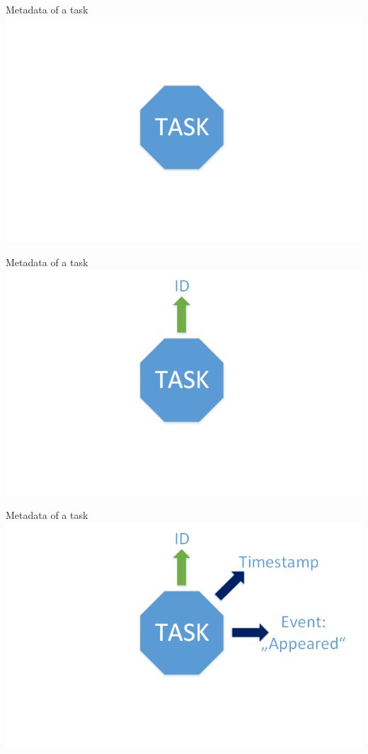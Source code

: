 


	\begin{frame}{Metadata of a task}
	\includegraphics[width=1.0\textwidth]{images/Task/zeichnungstep5.png}
	\end{frame}
	
	\begin{frame}{Metadata of a task}
	\includegraphics[width=1.0\textwidth]{images/Task/zeichnungstep4.png}
	\end{frame}
	
	\begin{frame}{Metadata of a task}
	\includegraphics[width=1.0\textwidth]{images/Task/zeichnungstep3.png}
	\end{frame}
	
